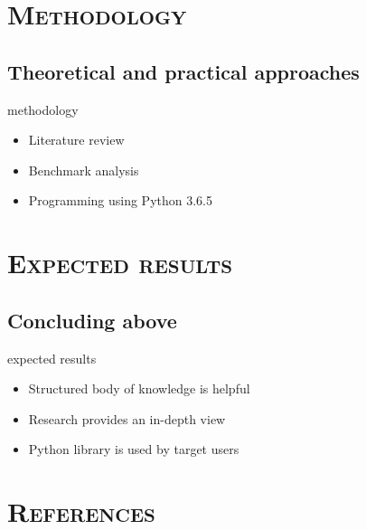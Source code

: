 \documentclass[xcolor=x11names,compress]{beamer}
\renewcommand{\(}{\begin{columns}}
\renewcommand{\)}{\end{columns}}
\newcommand{\<}[1]{\begin{column}{#1}}
\renewcommand{\>}{\end{column}}
\begin{document}
\section{\scshape Methodology}
\subsection{Theoretical and practical approaches}
\begin{frame}{methodology}
    \begin{itemize}
        \item Literature review
        \item Benchmark analysis
        \item Programming using Python 3.6.5
    \end{itemize}
\end{frame}


\section{\scshape Expected results}
\subsection{Concluding above}
\begin{frame}{expected results}
    \begin{itemize}
        \item Structured body of knowledge is helpful
        \item Research provides an in-depth view
        \item Python library is used by target users
    \end{itemize}
\end{frame}

\section{\scshape References}
\end{document}
